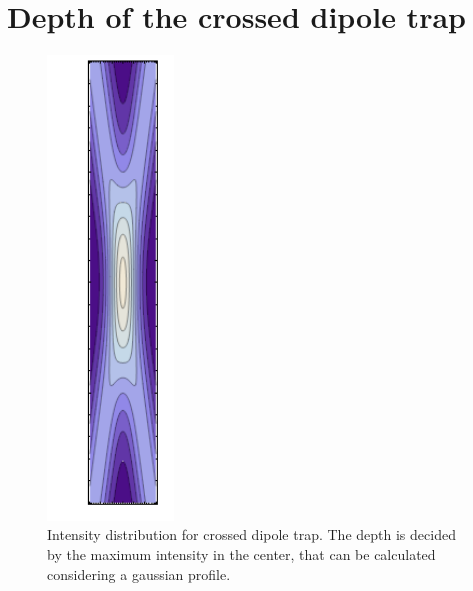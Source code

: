 \section{Depth of the crossed dipole trap}
\begin{figure}[H]
\centering
 \includegraphics[width=0.3\textwidth,angle=90]{crossed_dipole_trap}

\caption{Intensity distribution for crossed dipole trap. The depth is decided by the maximum intensity in the center, that can be calculated considering a gaussian profile.}
\label{dipolegraphic}
\end{figure}

